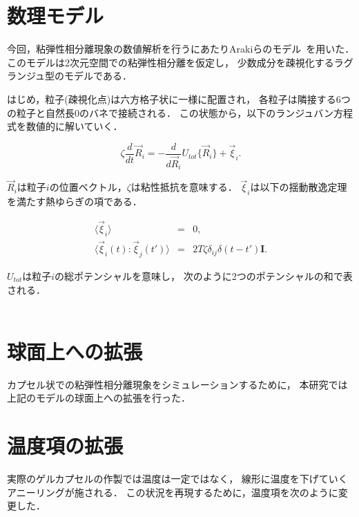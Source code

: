 
\section{数理モデル}
今回，粘弾性相分離現象の数値解析を行うにあたりArakiらのモデル~\cite{araki2005simple}を用いた．
このモデルは2次元空間での粘弾性相分離を仮定し，
少数成分を疎視化するラグランジュ型のモデルである．

はじめ，粒子(疎視化点)は六方格子状に一様に配置され，
各粒子は隣接する6つの粒子と自然長$0$のバネで接続される．
この状態から，以下のランジュバン方程式を数値的に解いていく．

\begin{equation}
\zeta
\frac{d}{dt}
\vec{R}_i
=
-\frac{d}{d\vec{R}_i}
U_{tot}\{\vec{R}_i\}
+\vec{\xi}_i
.
\end{equation}

$\vec{R}_i$は粒子$i$の位置ベクトル，$\zeta$は粘性抵抗を意味する．
$\vec{\xi}_i$は以下の揺動散逸定理を満たす熱ゆらぎの項である．

\begin{eqnarray}
\langle\vec{\xi}_i\rangle &=& 0, \\
\langle\vec{\xi}_i(t):\vec{\xi}_j(t')\rangle &=& 2T\zeta\delta_{ij}\delta(t-t')\bm{I}.
\end{eqnarray}

$U_{tot}$は粒子$i$の総ポテンシャルを意味し，
次のように2つのポテンシャルの和で表される．

\begin{eqnarray}

\end{eqnarray}



\section{球面上への拡張}
カプセル状での粘弾性相分離現象をシミュレーションするために，
本研究では上記のモデルの球面上への拡張を行った．


\section{温度項の拡張}
実際のゲルカプセルの作製では温度は一定ではなく，
線形に温度を下げていくアニーリングが施される．
この状況を再現するために，温度項を次のように変更した．
